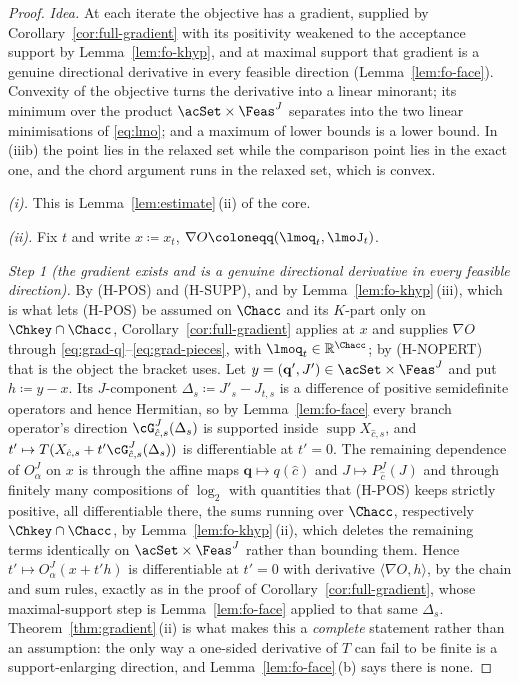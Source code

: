 \begin{proof}
\emph{Idea.} At each iterate the objective has a gradient, supplied by
Corollary~\ref{cor:full-gradient} with its positivity weakened to the
acceptance support by Lemma~\ref{lem:fo-khyp}, and at maximal support that
gradient is a genuine directional derivative in every feasible direction
(Lemma~\ref{lem:fo-face}). Convexity of the objective turns the
derivative into a linear minorant; its minimum over the product
$\acSet\times\Feas^{J}$ separates into the two linear minimisations of
\eqref{eq:lmo}; and a maximum of lower bounds is a lower bound.
In (iiib) the point lies in the relaxed set while the comparison point
lies in the exact one, and the chord argument runs in the relaxed set,
which is convex.

\emph{(i).} This is Lemma~\ref{lem:estimate}\,(ii) of the core.

\emph{(ii).} Fix $t$ and write $x\coloneqq x_t$,
$\nabla O\coloneqq(\lmoq_t,\lmoJ_t)$.

\emph{Step 1 (the gradient exists and is a genuine directional derivative
in every feasible direction).} By (H-POS) and (H-SUPP), and by
Lemma~\ref{lem:fo-khyp}\,(iii), which is what lets (H-POS) be assumed
on $\Chacc$ and its $K$-part only on $\Chkey\cap\Chacc$,
Corollary~\ref{cor:full-gradient} applies at $x$ and supplies
$\nabla O$ through \eqref{eq:grad-q}--\eqref{eq:grad-pieces}, with
$\lmoq_t\in\mathbb{R}^{\Chacc}$; by
(H-NOPERT) that is the object the bracket uses. Let
$y=(\mathbf q',J')\in\acSet\times\Feas^{J}$ and put $h\coloneqq y-x$. Its
$J$-component $\Delta_s\coloneqq J'_s-J_{t,s}$ is a difference of positive
semidefinite operators and hence Hermitian, so by
Lemma~\ref{lem:fo-face} every branch operator's direction
$\cG^{J}_{\hat c,s}(\Delta_s)$ is supported inside
$\operatorname{supp}X_{\hat c,s}$, and $t'\mapsto T(X_{\hat c,s}
+t'\cG^{J}_{\hat c,s}(\Delta_s))$ is differentiable at $t'=0$. The
remaining dependence of $O^{J}_{\alpha}$ on $x$ is through the affine maps
$\mathbf q\mapsto q(\hat c)$ and $J\mapsto P^{J}_{\hat c}(J)$ and through
finitely many compositions of $\log_2$ with quantities that (H-POS) keeps
strictly positive, all differentiable there, the sums running over
$\Chacc$, respectively $\Chkey\cap\Chacc$, by
Lemma~\ref{lem:fo-khyp}\,(ii), which deletes the remaining terms
identically on $\acSet\times\Feas^{J}$ rather than bounding them. Hence
$t'\mapsto O^{J}_{\alpha}(x+t'h)$ is differentiable at $t'=0$ with
derivative $\langle\nabla O,h\rangle$, by the chain and sum rules, exactly
as in the proof of Corollary~\ref{cor:full-gradient}, whose
maximal-support step is Lemma~\ref{lem:fo-face} applied to that same
$\Delta_s$. Theorem~\ref{thm:gradient}\,(ii) is what makes this a
\emph{complete} statement rather than an assumption: the only way a
one-sided derivative of $T$ can fail to be finite is a support-enlarging
direction, and Lemma~\ref{lem:fo-face}\,(b) says there is none.


\end{proof}
